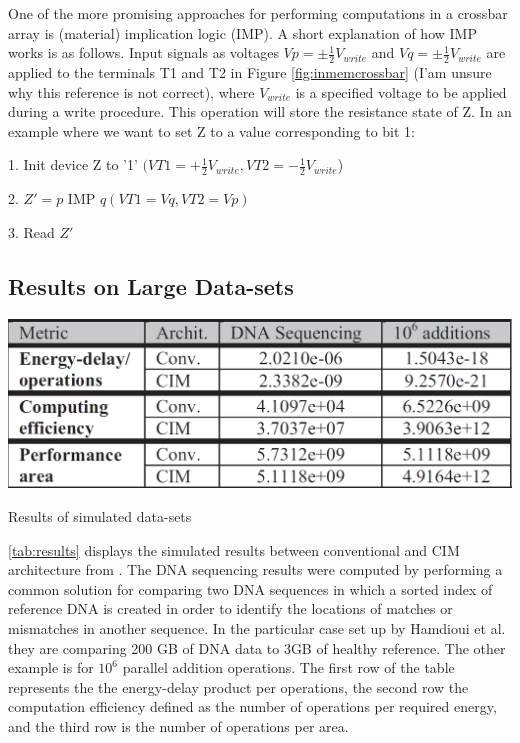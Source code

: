 \documentclass{sig-alternate}
\begin{document}
One of the more promising approaches for performing computations in a crossbar array is (material) implication logic (IMP).  A short explanation of how IMP works is as follows.  Input signals as voltages $ Vp = \pm \frac{1}{2} V_{write} $ and $ Vq = \pm \frac{1}{2} V_{write} $ are applied to the terminals T1 and T2 in Figure \ref{fig:inmemcrossbar} (I'am unsure why this reference is not correct), where $V_{write}$ is a specified voltage to be applied during a write procedure.  This operation will store the resistance state of Z.  In an example where we want to set Z to a value corresponding to bit 1:

1. Init device Z to '1' $(VT1 = + \frac{1}{2} V_{write}, VT2 = -\frac{1}{2} V_{write}$)

2. $Z' = p$ IMP $q (VT1 = Vq, VT2 = Vp)$

3. Read $Z'$

\subsection{Results on Large Data-sets}
\label{sec:theoremLikeConstructs}

\begin{table}[h!]
  \includegraphics[width=\linewidth]{resulttable.png}
  \caption{Results of simulated data-sets}
  \label{tab:results}
\end{table}

\ref{tab:results} displays the simulated results between conventional and CIM architecture from \cite{Hamdioui:2015:MBC:2755753.2757210}.  The DNA sequencing results were computed by performing a common solution for comparing two DNA sequences in which a sorted index of reference DNA is created in order to identify the locations of matches or mismatches in another sequence.  In the particular case set up by Hamdioui et al. they are comparing 200 GB of DNA data to 3GB of healthy reference. The other example is for $10^6$ parallel addition operations.  The first row of the table represents the the energy-delay product per operations, the second row the computation efficiency defined as the number of operations per required energy, and the third row is the number of operations per area. 
\end{document}
